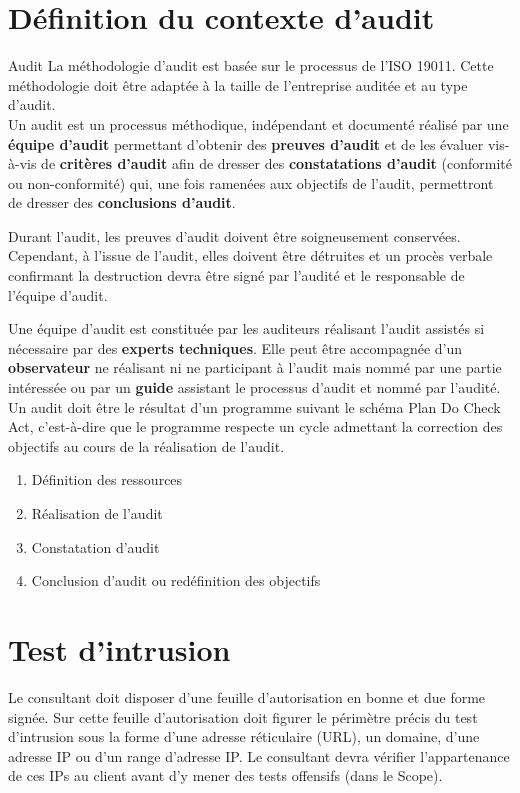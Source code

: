 \documentclass[twoside,a4paper,12pt,titlepage]{book}
\begin{document}
\chapter*{Définition du contexte d'audit}
\begin{Define}{Audit}
La méthodologie d'audit est basée sur le processus de l'ISO 19011. Cette méthodologie doit être adaptée à la taille de l'entreprise auditée et au type d'audit.\\
Un audit est un processus méthodique, indépendant et documenté réalisé par une \textbf{équipe d'audit} permettant d'obtenir des \textbf{preuves d'audit} et de les évaluer vis-à-vis de \textbf{critères d'audit} afin de dresser des \textbf{constatations d'audit} (conformité ou non-conformité) qui, une fois ramenées aux objectifs de l'audit, permettront de dresser des \textbf{conclusions d'audit}.
\end{Define}
\begin{Warning}
Durant l'audit, les preuves d'audit doivent être soigneusement conservées. Cependant, à l'issue de l'audit, elles doivent être détruites et un procès verbale confirmant la destruction devra être signé par l'audité et le responsable de l'équipe d'audit.
\end{Warning}
Une équipe d'audit est constituée par les auditeurs réalisant l'audit assistés si nécessaire par des \textbf{experts techniques}. Elle peut être accompagnée d'un \textbf{observateur} ne réalisant ni ne participant à l'audit mais nommé par une partie intéressée ou par un \textbf{guide} assistant le processus d'audit et nommé par l'audité.\newline\newline
Un audit doit être le résultat d'un programme suivant le schéma Plan Do Check Act, c'est-à-dire que le programme respecte un cycle admettant la correction des objectifs au cours de la réalisation de l'audit. \begin{enumerate}
\item Définition des ressources
\item Réalisation de l'audit
\item Constatation d'audit
\item Conclusion d'audit ou redéfinition des objectifs
\end{enumerate}

\chapter{Test d'intrusion}
\begin{Pre}Le consultant doit disposer d'une feuille d'autorisation en bonne et due forme signée. Sur cette feuille d'autorisation doit figurer le périmètre précis du test d'intrusion sous la forme d'une adresse réticulaire (\gls{URL}), un domaine, d'une adresse IP ou d'un range d'adresse IP. Le consultant devra vérifier l'appartenance de ces IPs au client avant d'y mener des tests offensifs (dans le Scope).\end{Pre}
\end{document}
